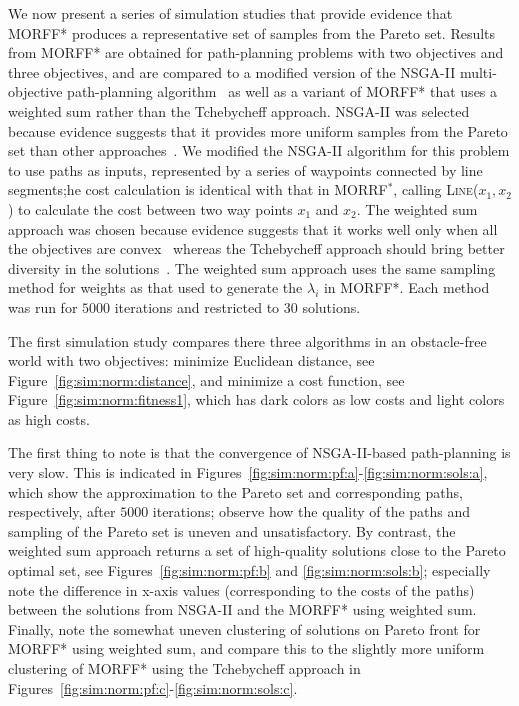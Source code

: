 \documentclass{article}
\begin{document}
We now present a series of simulation studies that provide evidence that MORFF* produces a representative set of samples from the Pareto set.
Results from MORFF* are obtained for path-planning problems with two objectives and three objectives, and are compared to a modified version of the NSGA-II multi-objective path-planning algorithm~\cite{Ahmed2013} as well as a variant of MORFF* that uses a weighted sum rather than the Tchebycheff approach.
NSGA-II was selected because evidence suggests that it provides more uniform samples from the Pareto set than other approaches~\cite{deb2002fast}.  
We modified the NSGA-II algorithm for this problem to use paths as inputs, represented by a series of waypoints connected by line segments;he cost calculation is identical with that in  MORRF$^{*}$, calling \textsc{Line}($ x_{1}, x_{2} $) to calculate the cost between two way points $ x_{1} $ and $ x_{2} $.  
The weighted sum approach was chosen because evidence suggests that it works well only when all the objectives are convex~\cite{4358754} whereas the Tchebycheff approach should bring better diversity in the solutions~\cite{4358754}.  
The weighted sum approach uses the same sampling method for weights as that used to generate the $\lambda_i$ in MORFF*.
Each method was run for $ 5000 $ iterations and restricted to $ 30 $ solutions.  

The first simulation study compares there three algorithms in an obstacle-free world with two objectives: 
minimize Euclidean distance, see Figure~\ref{fig:sim:norm:distance}, and minimize a cost function, see Figure~\ref{fig:sim:norm:fitness1}, which has dark colors as low costs and light colors as high costs.  


The first thing to note is that the convergence of NSGA-II-based path-planning is very slow.
This is indicated in Figures~\ref{fig:sim:norm:pf:a}-\ref{fig:sim:norm:sols:a}, which show the approximation to the Pareto set and corresponding paths, respectively, after $5000$ iterations; observe how the quality of the paths and sampling of the Pareto set is uneven and unsatisfactory.
By contrast, the weighted sum approach returns a set of high-quality solutions close to the Pareto optimal set, see Figures~\ref{fig:sim:norm:pf:b} and \ref{fig:sim:norm:sols:b}; especially note the difference in x-axis values (corresponding to the costs of the paths) between the solutions from NSGA-II and the MORFF* using weighted sum.
Finally, note the somewhat uneven clustering of solutions on Pareto front for MORFF* using weighted sum, and compare this to the slightly more uniform clustering of MORFF* using the Tchebycheff approach in Figures~\ref{fig:sim:norm:pf:c}-\ref{fig:sim:norm:sols:c}.
\end{document}
